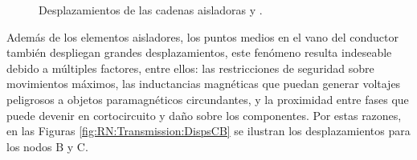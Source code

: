 \begingroup
\centering
\begin{figure}[htbp]
	\centering
	\caption{Desplazamientos de las cadenas aisladoras  y .} \label{fig:RN:Transmission:DispsAD}
\end{figure}
\endgroup

Además de los elementos aisladores, los puntos medios en el vano del conductor también despliegan grandes desplazamientos, este fenómeno resulta indeseable debido a múltiples factores, entre ellos: las restricciones de seguridad sobre movimientos máximos, las inductancias magnéticas que puedan generar voltajes peligrosos a objetos paramagnéticos circundantes, y la proximidad entre fases que puede devenir en cortocircuito y daño sobre los componentes. Por estas razones, en las Figuras \ref{fig:RN:Transmission:DispsCB} se ilustran los desplazamientos para los nodos $\text{B}$ y $\text{C}$. 


